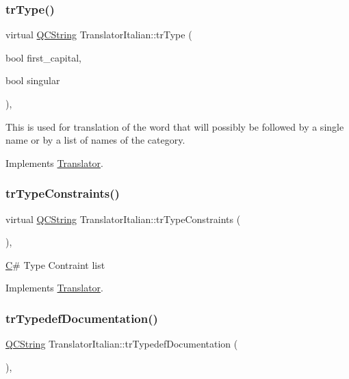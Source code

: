 \subsubsection{\texorpdfstring{trType()}{trType()}}
{\footnotesize\ttfamily virtual \mbox{\hyperlink{class_q_c_string}{Q\+C\+String}} Translator\+Italian\+::tr\+Type (\begin{DoxyParamCaption}\item[{bool}]{first\+\_\+capital,  }\item[{bool}]{singular }\end{DoxyParamCaption})\hspace{0.3cm}{\ttfamily [inline]}, {\ttfamily [virtual]}}

This is used for translation of the word that will possibly be followed by a single name or by a list of names of the category. 

Implements \mbox{\hyperlink{class_translator}{Translator}}.

\mbox{\label{class_translator_italian_a60c14a7c39acb5257895aa373d62b357}} 
\subsubsection{\texorpdfstring{trTypeConstraints()}{trTypeConstraints()}}
{\footnotesize\ttfamily virtual \mbox{\hyperlink{class_q_c_string}{Q\+C\+String}} Translator\+Italian\+::tr\+Type\+Constraints (\begin{DoxyParamCaption}{ }\end{DoxyParamCaption})\hspace{0.3cm}{\ttfamily [inline]}, {\ttfamily [virtual]}}

\mbox{\hyperlink{class_c}{C}}\# Type Contraint list 

Implements \mbox{\hyperlink{class_translator}{Translator}}.

\mbox{\label{class_translator_italian_afd2f70e60e563344ef62b76367170148}} 
\subsubsection{\texorpdfstring{trTypedefDocumentation()}{trTypedefDocumentation()}}
{\footnotesize\ttfamily \mbox{\hyperlink{class_q_c_string}{Q\+C\+String}} Translator\+Italian\+::tr\+Typedef\+Documentation (\begin{DoxyParamCaption}{ }\end{DoxyParamCaption})\hspace{0.3cm}{\ttfamily [inline]}, {\ttfamily [virtual]}}

